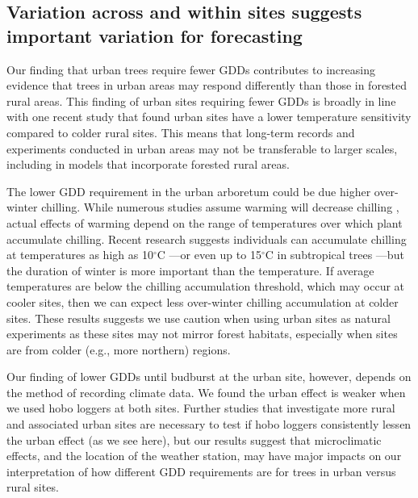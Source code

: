 \documentclass{article}\usepackage[]{graphicx}\usepackage[]{color}
\begin{document}
\subsection*{Variation across and within sites suggests important variation for forecasting} 
Our finding that urban trees require fewer GDDs contributes to increasing evidence that trees in urban areas may respond differently than those in forested rural areas. This finding of urban sites requiring fewer GDDs is broadly in line with one recent study that found urban sites have a lower temperature sensitivity \citep{Meng2020} compared to colder rural sites. This means that long-term records and experiments conducted in urban areas may not be transferable to larger scales, including in models that incorporate forested rural areas. 

The lower GDD requirement in the urban arboretum could be due higher over-winter chilling. While numerous studies assume warming will decrease chilling \citep{Asse2018, Fu2015, Luedeling2011}, actual effects of warming depend on the range of temperatures over which plant accumulate chilling. Recent research suggests individuals can accumulate chilling at temperatures as high as 10$^{\circ}$C \citep{Baumgarten2021}---or even up to 15$^{\circ}$C in subtropical trees \citep{Zhang2021}---but the duration of winter is more important than the temperature. If average temperatures are below the chilling accumulation threshold, which may occur at cooler sites, then we can expect less over-winter chilling accumulation at colder sites. These results suggests we use caution when using urban sites as natural experiments as these sites may not mirror forest habitats, especially when sites are from colder (e.g., more northern) regions.

Our finding of lower GDDs until budburst at the urban site, however, depends on the method of recording climate data. We found the urban effect is weaker when we used hobo loggers at both sites. Further studies that investigate more rural and associated urban sites are necessary to test if hobo loggers consistently lessen the urban effect (as we see here), but our results suggest that microclimatic effects, and the location of the weather station, may have major impacts on our interpretation of how different GDD requirements are for trees in urban versus rural sites. 
\end{document}
